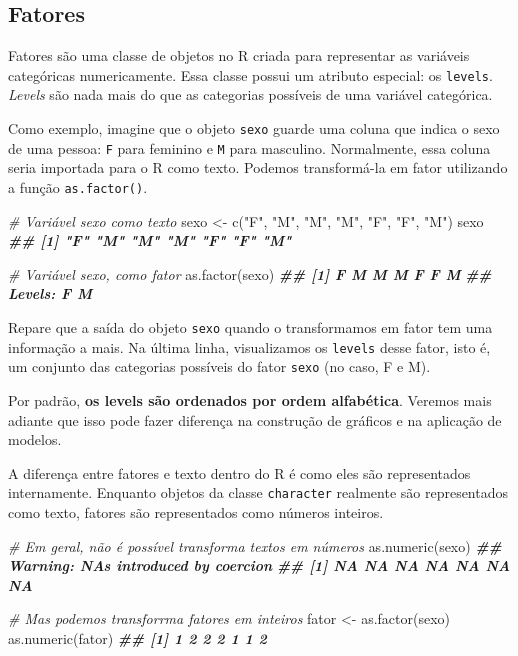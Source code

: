 \documentclass[
]{book}
\newenvironment{Shaded}{\begin{snugshade}}{\end{snugshade}}
\newcommand{\CommentTok}[1]{\textcolor[rgb]{0.56,0.35,0.01}{\textit{#1}}}
\newcommand{\DocumentationTok}[1]{\textcolor[rgb]{0.56,0.35,0.01}{\textbf{\textit{#1}}}}
\newcommand{\FunctionTok}[1]{\textcolor[rgb]{0.00,0.00,0.00}{#1}}
\newcommand{\NormalTok}[1]{#1}
\newcommand{\OtherTok}[1]{\textcolor[rgb]{0.56,0.35,0.01}{#1}}
\newcommand{\StringTok}[1]{\textcolor[rgb]{0.31,0.60,0.02}{#1}}
\begin{document}
\hypertarget{fatores}{%
\subsection{Fatores}\label{fatores}}

Fatores são uma classe de objetos no R criada para representar as variáveis categóricas numericamente. Essa classe possui um atributo especial: os \texttt{levels}. \emph{Levels} são nada mais do que as categorias possíveis de uma variável categórica.

Como exemplo, imagine que o objeto \texttt{sexo} guarde uma coluna que indica o sexo de uma pessoa: \texttt{F} para feminino e \texttt{M} para masculino. Normalmente, essa coluna seria importada para o R como texto. Podemos transformá-la em fator utilizando a função \texttt{as.factor()}.

\begin{Shaded}
\begin{Highlighting}[]
\CommentTok{\# Variável sexo como texto}
\NormalTok{sexo }\OtherTok{\textless{}{-}} \FunctionTok{c}\NormalTok{(}\StringTok{"F"}\NormalTok{, }\StringTok{"M"}\NormalTok{, }\StringTok{"M"}\NormalTok{, }\StringTok{"M"}\NormalTok{, }\StringTok{"F"}\NormalTok{, }\StringTok{"F"}\NormalTok{, }\StringTok{"M"}\NormalTok{)}
\NormalTok{sexo}
\DocumentationTok{\#\# [1] "F" "M" "M" "M" "F" "F" "M"}

\CommentTok{\# Variável sexo, como fator}
\FunctionTok{as.factor}\NormalTok{(sexo)}
\DocumentationTok{\#\# [1] F M M M F F M}
\DocumentationTok{\#\# Levels: F M}
\end{Highlighting}
\end{Shaded}

Repare que a saída do objeto \texttt{sexo} quando o transformamos em fator tem uma informação a mais. Na última linha, visualizamos os \texttt{levels} desse fator, isto é, um conjunto das categorias possíveis do fator \texttt{sexo} (no caso, F e M).

Por padrão, \textbf{os levels são ordenados por ordem alfabética}. Veremos mais adiante que isso pode fazer diferença na construção de gráficos e na aplicação de modelos.

A diferença entre fatores e texto dentro do R é como eles são representados internamente. Enquanto objetos da classe \texttt{character} realmente são representados como texto, fatores são representados como números inteiros.

\begin{Shaded}
\begin{Highlighting}[]
\CommentTok{\# Em geral, não é possível transforma textos em números}
\FunctionTok{as.numeric}\NormalTok{(sexo)}
\DocumentationTok{\#\# Warning: NAs introduced by coercion}
\DocumentationTok{\#\# [1] NA NA NA NA NA NA NA}

\CommentTok{\# Mas podemos transforrma fatores em inteiros}
\NormalTok{fator }\OtherTok{\textless{}{-}} \FunctionTok{as.factor}\NormalTok{(sexo)}
\FunctionTok{as.numeric}\NormalTok{(fator)}
\DocumentationTok{\#\# [1] 1 2 2 2 1 1 2}
\end{Highlighting}
\end{Shaded}
\end{document}
